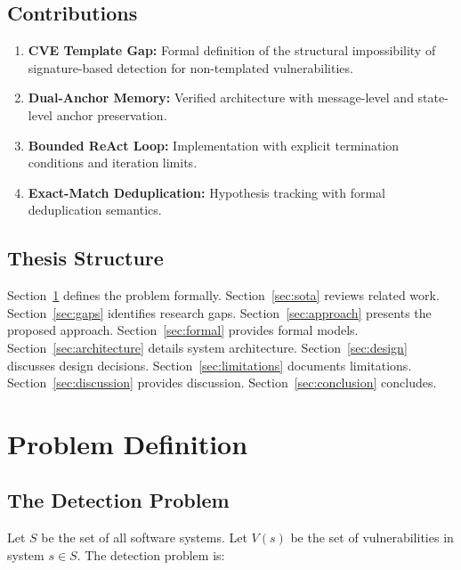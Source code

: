 \documentclass[11pt,a4paper]{article}
\theoremstyle{definition}
\begin{document}
\subsection{Contributions}

\begin{enumerate}[label=\textbf{C\arabic*:}, leftmargin=2em]
    \item \textbf{CVE Template Gap:} Formal definition of the structural impossibility of signature-based detection for non-templated vulnerabilities.
    \item \textbf{Dual-Anchor Memory:} Verified architecture with message-level and state-level anchor preservation.
    \item \textbf{Bounded ReAct Loop:} Implementation with explicit termination conditions and iteration limits.
    \item \textbf{Exact-Match Deduplication:} Hypothesis tracking with formal deduplication semantics.
\end{enumerate}

\subsection{Thesis Structure}

Section~\ref{sec:problem} defines the problem formally. Section~\ref{sec:sota} reviews related work. Section~\ref{sec:gaps} identifies research gaps. Section~\ref{sec:approach} presents the proposed approach. Section~\ref{sec:formal} provides formal models. Section~\ref{sec:architecture} details system architecture. Section~\ref{sec:design} discusses design decisions. Section~\ref{sec:limitations} documents limitations. Section~\ref{sec:discussion} provides discussion. Section~\ref{sec:conclusion} concludes.

\section{Problem Definition}
\label{sec:problem}

\subsection{The Detection Problem}

Let $S$ be the set of all software systems. Let $V(s)$ be the set of vulnerabilities in system $s \in S$. The detection problem is:
\end{document}
